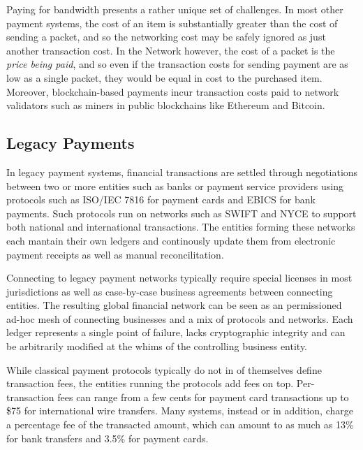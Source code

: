 
Paying for bandwidth presents a rather unique set of challenges. In most other payment systems, the cost of an item is substantially greater than the cost of sending a packet, and so the networking cost may be safely ignored as just another transaction cost. In the \Orchid{} Network however, the cost of a packet is the \emph{price being paid}, and so even if the transaction costs for sending payment are as low as a single packet, they would be equal in cost to the purchased item. Moreover, blockchain-based payments incur transaction costs paid to network validators such as miners in public blockchains like Ethereum and Bitcoin.

\subsection{Legacy Payments}

In legacy payment systems, financial transactions are settled through negotiations between two or more entities such as banks or payment service providers\cite{PSP} using protocols such as ISO/IEC 7816\cite{ISO7816} for payment cards and EBICS\cite{EBICS} for bank payments. Such protocols run on networks such as SWIFT\cite{SWIFT} and NYCE\cite{NYCE} to support both national and international transactions. The entities forming these networks each mantain their own ledgers and continously update them from electronic payment receipts as well as manual reconcilitation\cite{Reconcil}.

Connecting to legacy payment networks typically require special licenses in most jurisdictions as well as case-by-case business agreements between connecting entities. The resulting global financial network can be seen as an permissioned ad-hoc mesh of connecting businesses and a mix of protocols and networks. Each ledger represents a single point of failure, lacks cryptographic integrity and can be arbitrarily modified at the whims of the controlling business entity.

While classical payment protocols typically do not in of themselves define transaction fees, the entities running the protocols add fees on top. Per-transaction fees can range from a few cents for payment card transactions\cite{CardFees1} up to \$75 for international wire transfers\cite{WireTransfers1}. Many systems, instead or in addition, charge a percentage fee of the transacted amount, which can amount to as much as 13\%\cite{WireTransfers2} for bank transfers and 3.5\% for payment cards\cite{CardFees2}.

